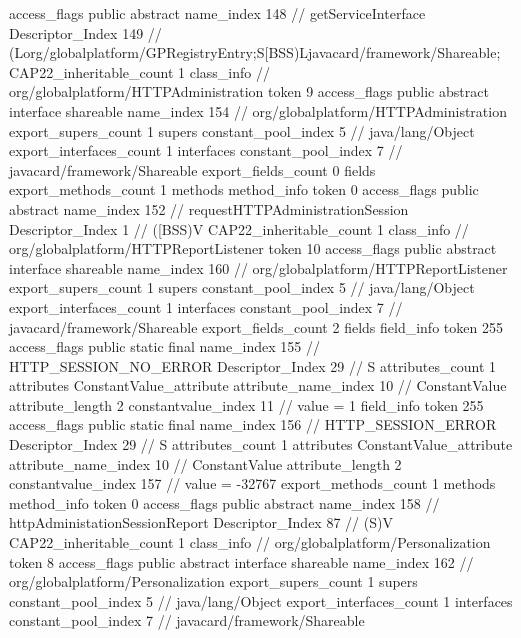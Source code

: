 {{{{{					access_flags	public abstract
					name_index	148		// getServiceInterface
					Descriptor_Index	149		// (Lorg/globalplatform/GPRegistryEntry;S[BSS)Ljavacard/framework/Shareable;
				}
			}
			CAP22_inheritable_count	1
		}
		class_info {		// org/globalplatform/HTTPAdministration
			token	9
			access_flags	public abstract interface shareable
			name_index	154		// org/globalplatform/HTTPAdministration
			export_supers_count	1
			supers {
				constant_pool_index	5		// java/lang/Object
			}
			export_interfaces_count	1
			interfaces {
				constant_pool_index	7		// javacard/framework/Shareable
			}
			export_fields_count	0
			fields {
			}
			export_methods_count	1
			methods {
				method_info {
					token	0
					access_flags	public abstract
					name_index	152		// requestHTTPAdministrationSession
					Descriptor_Index	1		// ([BSS)V
				}
			}
			CAP22_inheritable_count	1
		}
		class_info {		// org/globalplatform/HTTPReportListener
			token	10
			access_flags	public abstract interface shareable
			name_index	160		// org/globalplatform/HTTPReportListener
			export_supers_count	1
			supers {
				constant_pool_index	5		// java/lang/Object
			}
			export_interfaces_count	1
			interfaces {
				constant_pool_index	7		// javacard/framework/Shareable
			}
			export_fields_count	2
			fields {
			field_info {
				token	255
				access_flags	public static final
				name_index	155		// HTTP_SESSION_NO_ERROR
				Descriptor_Index	29		// S
				attributes_count	1
				attributes {
				ConstantValue_attribute {
					attribute_name_index	10		// ConstantValue
					attribute_length	2
					constantvalue_index	11		// value = 1
				}
				}
			}
			field_info {
				token	255
				access_flags	public static final
				name_index	156		// HTTP_SESSION_ERROR
				Descriptor_Index	29		// S
				attributes_count	1
				attributes {
				ConstantValue_attribute {
					attribute_name_index	10		// ConstantValue
					attribute_length	2
					constantvalue_index	157		// value = -32767
				}
				}
			}
			}
			export_methods_count	1
			methods {
				method_info {
					token	0
					access_flags	public abstract
					name_index	158		// httpAdministationSessionReport
					Descriptor_Index	87		// (S)V
				}
			}
			CAP22_inheritable_count	1
		}
		class_info {		// org/globalplatform/Personalization
			token	8
			access_flags	public abstract interface shareable
			name_index	162		// org/globalplatform/Personalization
			export_supers_count	1
			supers {
				constant_pool_index	5		// java/lang/Object
			}
			export_interfaces_count	1
			interfaces {
				constant_pool_index	7		// javacard/framework/Shareable
			}
}}}
